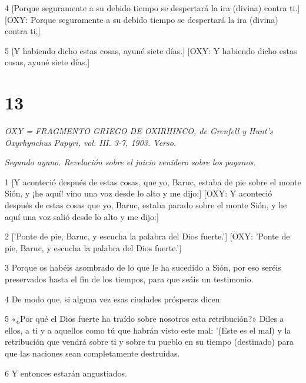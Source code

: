 \par 4 [Porque seguramente a su debido tiempo se despertará la ira (divina) contra ti.] [OXY: Porque seguramente a su debido tiempo se despertará la ira (divina) contra ti,]

\par [El cual ahora con gran paciencia está retenido como por riendas.] [OXY: Que ahora está retenido por gran paciencia como por riendas.]

\par 5 [Y habiendo dicho estas cosas, ayuné siete días.] [OXY: Y habiendo dicho estas cosas, ayuné siete días.]


\chapter{13}

\par \textit{OXY = FRAGMENTO GRIEGO DE OXIRHINCO, de Grenfell y Hunt's Oxyrhynchus Papyri, vol. III. 3-7, 1903. Verso.}

\par \textit{Segundo ayuno. Revelación sobre el juicio venidero sobre los paganos.}

\par 1 [Y aconteció después de estas cosas, que yo, Baruc, estaba de pie sobre el monte Sión, y ¡he aquí! vino una voz desde lo alto y me dijo:] [OXY: Y aconteció después de estas cosas que yo, Baruc, estaba parado sobre el monte Sión, y he aquí una voz salió desde lo alto y me dijo:]

\par 2 ['Ponte de pie, Baruc, y escucha la palabra del Dios fuerte.'] [OXY: 'Ponte de pie, Baruc, y escucha la palabra del Dios fuerte.']

\par 3 Porque os habéis asombrado de lo que le ha sucedido a Sión, por eso seréis preservados hasta el fin de los tiempos, para que seáis un testimonio.

\par 4 De modo que, si alguna vez esas ciudades prósperas dicen:

\par 5 «¿Por qué el Dios fuerte ha traído sobre nosotros esta retribución?» Diles a ellos, a ti y a aquellos como tú que habrán visto este mal: '(Este es el mal) y la retribución que vendrá sobre ti y sobre tu pueblo en su tiempo (destinado) para que las naciones sean completamente destruidas.

\par 6 Y entonces estarán angustiados.

